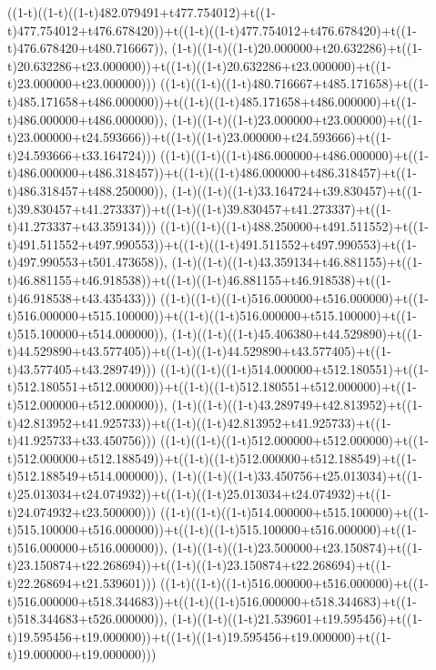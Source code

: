 ((1-t)((1-t)((1-t)482.079491+t477.754012)+t((1-t)477.754012+t476.678420))+t((1-t)((1-t)477.754012+t476.678420)+t((1-t)476.678420+t480.716667)),                                     (1-t)((1-t)((1-t)20.000000+t20.632286)+t((1-t)20.632286+t23.000000))+t((1-t)((1-t)20.632286+t23.000000)+t((1-t)23.000000+t23.000000)))
((1-t)((1-t)((1-t)480.716667+t485.171658)+t((1-t)485.171658+t486.000000))+t((1-t)((1-t)485.171658+t486.000000)+t((1-t)486.000000+t486.000000)),                                     (1-t)((1-t)((1-t)23.000000+t23.000000)+t((1-t)23.000000+t24.593666))+t((1-t)((1-t)23.000000+t24.593666)+t((1-t)24.593666+t33.164724)))
((1-t)((1-t)((1-t)486.000000+t486.000000)+t((1-t)486.000000+t486.318457))+t((1-t)((1-t)486.000000+t486.318457)+t((1-t)486.318457+t488.250000)),                                     (1-t)((1-t)((1-t)33.164724+t39.830457)+t((1-t)39.830457+t41.273337))+t((1-t)((1-t)39.830457+t41.273337)+t((1-t)41.273337+t43.359134)))
((1-t)((1-t)((1-t)488.250000+t491.511552)+t((1-t)491.511552+t497.990553))+t((1-t)((1-t)491.511552+t497.990553)+t((1-t)497.990553+t501.473658)),                                     (1-t)((1-t)((1-t)43.359134+t46.881155)+t((1-t)46.881155+t46.918538))+t((1-t)((1-t)46.881155+t46.918538)+t((1-t)46.918538+t43.435433)))
((1-t)((1-t)((1-t)516.000000+t516.000000)+t((1-t)516.000000+t515.100000))+t((1-t)((1-t)516.000000+t515.100000)+t((1-t)515.100000+t514.000000)),                                     (1-t)((1-t)((1-t)45.406380+t44.529890)+t((1-t)44.529890+t43.577405))+t((1-t)((1-t)44.529890+t43.577405)+t((1-t)43.577405+t43.289749)))
((1-t)((1-t)((1-t)514.000000+t512.180551)+t((1-t)512.180551+t512.000000))+t((1-t)((1-t)512.180551+t512.000000)+t((1-t)512.000000+t512.000000)),                                     (1-t)((1-t)((1-t)43.289749+t42.813952)+t((1-t)42.813952+t41.925733))+t((1-t)((1-t)42.813952+t41.925733)+t((1-t)41.925733+t33.450756)))
((1-t)((1-t)((1-t)512.000000+t512.000000)+t((1-t)512.000000+t512.188549))+t((1-t)((1-t)512.000000+t512.188549)+t((1-t)512.188549+t514.000000)),                                     (1-t)((1-t)((1-t)33.450756+t25.013034)+t((1-t)25.013034+t24.074932))+t((1-t)((1-t)25.013034+t24.074932)+t((1-t)24.074932+t23.500000)))
((1-t)((1-t)((1-t)514.000000+t515.100000)+t((1-t)515.100000+t516.000000))+t((1-t)((1-t)515.100000+t516.000000)+t((1-t)516.000000+t516.000000)),                                     (1-t)((1-t)((1-t)23.500000+t23.150874)+t((1-t)23.150874+t22.268694))+t((1-t)((1-t)23.150874+t22.268694)+t((1-t)22.268694+t21.539601)))
((1-t)((1-t)((1-t)516.000000+t516.000000)+t((1-t)516.000000+t518.344683))+t((1-t)((1-t)516.000000+t518.344683)+t((1-t)518.344683+t526.000000)),                                     (1-t)((1-t)((1-t)21.539601+t19.595456)+t((1-t)19.595456+t19.000000))+t((1-t)((1-t)19.595456+t19.000000)+t((1-t)19.000000+t19.000000)))
